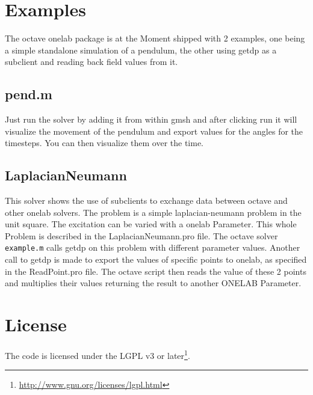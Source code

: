 \documentclass[article,english,colorback,accentcolor=tud9b,11pt]{tudreport}
\begin{document}
		\section{Examples}
		The octave onelab package is at the Moment shipped with 2 examples, one being a simple standalone simulation of a pendulum, the other using getdp as a subclient and reading back field values from it.
		\subsection{pend.m}
		Just run the solver by adding it from within gmsh and after clicking run it will visualize the movement of the pendulum and export values for the angles for the timesteps. You can then visualize them over the time.
		\subsection{LaplacianNeumann}
		This solver shows the use of subclients to exchange data between octave and other onelab solvers. The problem is a simple laplacian-neumann problem in the unit square. The excitation can be varied with a onelab Parameter. This whole Problem is described in the LaplacianNeumann.pro file. The octave solver \texttt{example.m} calls getdp on this problem with different parameter values. Another call to getdp is made to export the values of specific points to onelab, as specified in the ReadPoint.pro file. The octave script then reads the value of these 2 points and multiplies their values returning the result to another ONELAB Parameter. 

		\section{License}
		The code is licensed under the LGPL v3 or later\footnote{\url{http://www.gnu.org/licenses/lgpl.html}}.
\end{document}
